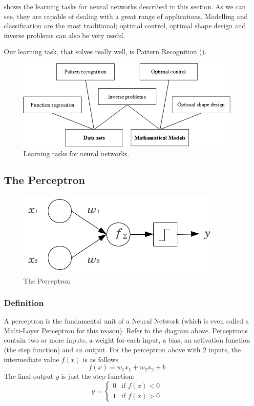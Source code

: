  shows the learning tasks for neural networks described in this section. 
As we can see, they are capable of dealing with a great range of applications. 
Modelling and classification are the most traditional; 
optimal control, optimal shape design and inverse problems can also be very useful.

Our learning task, that \maskrcnn solves really well, is Pattern Recognition ().

\begin{figure}[H]
	\begin{center}
		\includegraphics[width=1.0\textwidth]{neural_networks_basis/learning_tasks}
		\caption{Learning tasks for neural networks.}\label{LearningTasksFigure}
	\end{center}
\end{figure}



\subsection{The Perceptron}\label{s:perc}
\begin{figure}[H]
	\centering
	\includegraphics[scale=0.5]{images/2MVdW}
	\caption{The Perceptron}
	\label{f:perceptron}
\end{figure}
\subsubsection{Definition}

A perceptron is the fundamental unit of a Neural Network (which is even called a Multi-Layer Perceptron for this reason). Refer to the diagram above. Perceptrons contain two or more inputs, a weight for each input, a bias, an activation function (the step function) and an output.
For the perceptron above with $2$ inputs, the intermediate value $f(x)$ is as follows
\[f(x) = w_1x_1 + w_2x_2 + b\]
The final output $y$ is just the step function:
\[
y =
\begin{cases}
0 & \text{if $f(x) < 0$} \\
1 & \text{if $f(x) > 0$}
\end{cases}
\]
